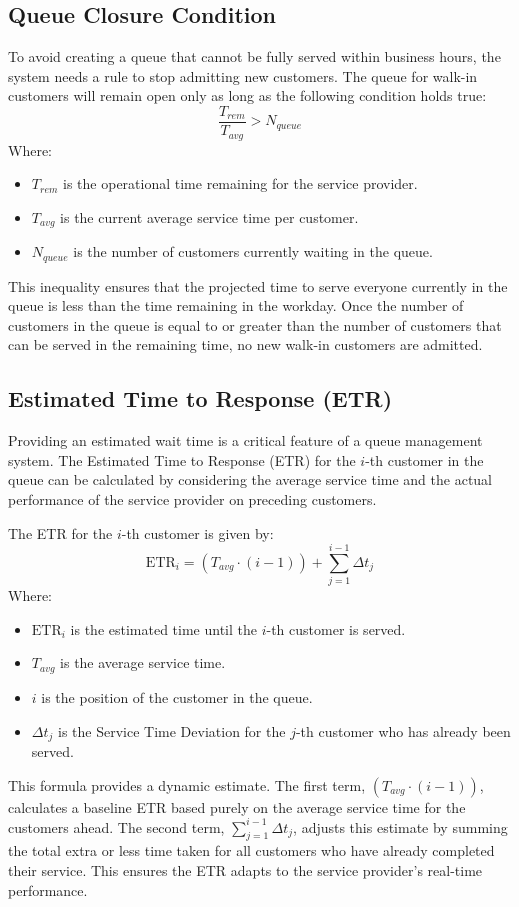 \documentclass[12pt,a4paper]{report}
\begin{document}
\subsection{Queue Closure Condition}
To avoid creating a queue that cannot be fully served within business hours, the system needs a rule to stop admitting new customers. The queue for walk-in customers will remain open only as long as the following condition holds true:
\begin{equation}
    \frac{T_{rem}}{T_{avg}} > N_{queue}
\end{equation}
Where:
\begin{itemize}
    \item $T_{rem}$ is the operational time remaining for the service provider.
    \item $T_{avg}$ is the current average service time per customer.
    \item $N_{queue}$ is the number of customers currently waiting in the queue.
\end{itemize}
This inequality ensures that the projected time to serve everyone currently in the queue is less than the time remaining in the workday. Once the number of customers in the queue is equal to or greater than the number of customers that can be served in the remaining time, no new walk-in customers are admitted.

\subsection{Estimated Time to Response (ETR)}
Providing an estimated wait time is a critical feature of a queue management system. The Estimated Time to Response (ETR) for the $i$-th customer in the queue can be calculated by considering the average service time and the actual performance of the service provider on preceding customers.

The ETR for the $i$-th customer is given by:
\begin{equation}
    \text{ETR}_i = (T_{avg} \cdot (i - 1)) + \sum_{j=1}^{i-1} \Delta t_j
\end{equation}
Where:
\begin{itemize}
    \item $\text{ETR}_i$ is the estimated time until the $i$-th customer is served.
    \item $T_{avg}$ is the average service time.
    \item $i$ is the position of the customer in the queue.
    \item $\Delta t_j$ is the Service Time Deviation for the $j$-th customer who has already been served.
\end{itemize}
This formula provides a dynamic estimate. The first term, $(T_{avg} \cdot (i - 1))$, calculates a baseline ETR based purely on the average service time for the customers ahead. The second term, $\sum_{j=1}^{i-1} \Delta t_j$, adjusts this estimate by summing the total extra or less time taken for all customers who have already completed their service. This ensures the ETR adapts to the service provider's real-time performance.
\end{document}
